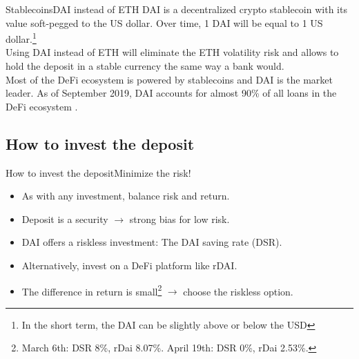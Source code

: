 \documentclass{beamer}
\begin{document}
\begin{frame}{Stablecoins}{DAI instead of ETH}
	DAI is a decentralized crypto stablecoin with its value soft-pegged to the US dollar. Over time, 1 DAI will be equal to 1 US dollar.\footnote{In the short term, the DAI can be slightly above or below the USD}\pause \\ 
	\vspace{1em}
	Using DAI instead of ETH will eliminate the ETH volatility risk and allows to hold the deposit in a stable currency the same way a bank would.\pause \\ 
	\vspace{1em}
	Most of the DeFi ecosystem is powered by stablecoins and DAI is the market leader. As of September 2019, DAI accounts for almost 90\% of all loans in the DeFi ecosystem \cite{Schaer2020}.
	
\end{frame}

\subsection{How to invest the deposit}

\begin{frame}{How to invest the deposit}{Minimize the risk!}
	\begin{itemize}
		\item<1->As with any investment, balance risk and return.
		\item<1-> Deposit is a security $\rightarrow$ strong bias for low risk.
		\vspace{1em}
		\item<2-> DAI offers a riskless investment: The DAI saving rate (DSR).
		\item<2-> Alternatively, invest on a DeFi platform like rDAI.
		\vspace{1em}
		\item<3-> The difference in return is small\footnote<3->{March 6th: DSR 8\%, rDai 8.07\%. April 19th: DSR 0\%, rDai 2.53\%.} $\rightarrow$ choose the riskless option.
	\end{itemize}
\end{frame}
\end{document}
